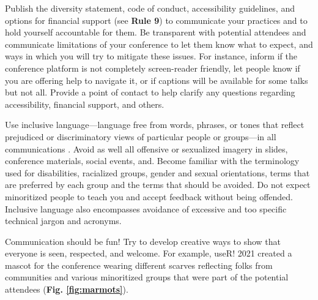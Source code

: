 \documentclass[10pt,letterpaper]{article}
\begin{document}
Publish the diversity statement, code of conduct, accessibility guidelines, and options for financial support (see \textbf{Rule 9}) to communicate your practices and to hold yourself accountable for them.
Be transparent with potential attendees and communicate limitations of your conference to let them know what to expect, and ways in which you will try to mitigate these issues. 
For instance, inform if the conference platform is not completely screen-reader friendly, let people know if you are offering help to navigate it, or if captions will be available for some talks but not all.
Provide a point of contact to help clarify any questions regarding accessibility, financial support, and others.

Use inclusive language—language free from words, phrases, or tones that reflect prejudiced or discriminatory views of particular people or groups—in all communications \cite{hallDesigningDiversityInclusion2019}. 
Avoid as well all offensive or sexualized imagery in slides, conference materials, social events, and.
Become familiar with the terminology used for disabilities, racialized groups, gender and sexual orientations, terms that are preferred by each group and the terms that should be avoided.
Do not expect minoritized people to teach you and accept feedback without being offended.
Inclusive language also encompasses avoidance of excessive and too specific technical jargon and acronyms. 

Communication should be fun! Try to develop creative ways to show that everyone is seen, respected, and welcome. 
For example, useR! 2021 created a mascot for the conference wearing different scarves reflecting folks from communities and various minoritized groups that were part of the potential attendees (\textbf{Fig. \ref{fig:marmots}}). 
\end{document}
